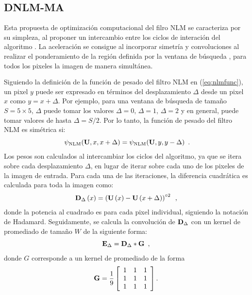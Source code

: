 \subsection{DNLM-MA}
\label{ch:marco_condat}

Esta propuesta de optimización computacional del filro NLM se caracteriza por su simpleza, al proponer un intercambio entre los ciclos de interación del algoritmo \cite{Condat2010}. La aceleración se consigue al incorporar simetría y convoluciones al realizar el ponderamiento de la región definida por la ventana de búsqueda \mat{\Omega}, para todos los pixeles la imagen de manera simultánea.

Siguiendo la definición de la función de pesado del filtro NLM en (\ref{eq:nlmfunc}), un pixel $y$ puede ser expresado en términos del desplazamiento $\Delta$ desde un pixel $x$ como $y = x + \Delta$. Por ejemplo, para una ventana de búsqueda de tama\~no $S = 5 \times 5$, $\Delta$ puede tomar los valores $\Delta=0$, $\Delta=1$, $\Delta=2$ y en general, puede tomar valores de hasta $\Delta=S/2$. Por lo tanto, la función de pesado del filtro NLM es simétrica si:
%
\begin{equation}\
\psi_{\text{NLM}}(\mathbf{U}, x, x + \Delta) = \psi_{\text{NLM}}(\mathbf{U}, y, y - \Delta)  \enspace . 
\label{eq:symmetry}
\end{equation}
%
Los pesos son calculados al intercambiar los ciclos del algoritmo, ya que se itera sobre cada desplazamiento $\Delta$, en lugar de iterar sobre cada uno de los pixeles de la imagen de entrada. Para cada una de las iteraciones, la diferencia cuadrática es calculada para toda la imagen como:
%
\begin{equation}
\mathbf{D}_\Delta\left(x\right) = \left(\mathbf{U}\left(x\right) - \mathbf{U}\left( x + \Delta \right)\right)^{\circ2}  \enspace ,
\label{eq:diffquad}
\end{equation}
%
donde la potencia al cuadrado es para cada pixel individual, siguiendo la notación de Hadamard. Seguidamente, se calcula la convolución de
$\mathbf{D}_\Delta$ con un kernel de promediado de tama\~no $W$ de la siguiente forma:
\begin{equation}
\label{eq:convmoas}
\mathbf{E}_{\Delta} = \mathbf{D}_{\Delta} * \mathbf{G} \enspace ,
\end{equation}
%
donde $G$ corresponde a un kernel de promediado de la forma 
\begin{equation*}
\mathbf{G} = \frac{1}{9}\left[\begin{array}{ccc}
1 & 1 & 1\\
1 & 1 & 1\\
1 & 1 & 1
\end{array}\right].
\end{equation*}
